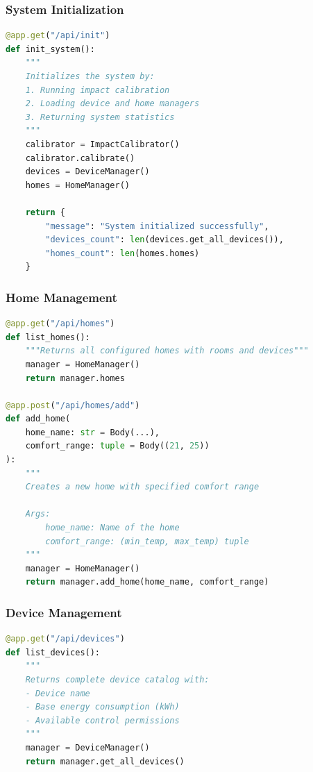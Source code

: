 \documentclass[12pt,a4paper]{article}
\begin{document}
\subsubsection{System Initialization}

\begin{lstlisting}[language=Python, caption=System initialization endpoint]
@app.get("/api/init")
def init_system():
    """
    Initializes the system by:
    1. Running impact calibration
    2. Loading device and home managers
    3. Returning system statistics
    """
    calibrator = ImpactCalibrator()
    calibrator.calibrate()
    devices = DeviceManager()
    homes = HomeManager()
    
    return {
        "message": "System initialized successfully",
        "devices_count": len(devices.get_all_devices()),
        "homes_count": len(homes.homes)
    }
\end{lstlisting}

\subsubsection{Home Management}

\begin{lstlisting}[language=Python, caption=Home management endpoints]
@app.get("/api/homes")
def list_homes():
    """Returns all configured homes with rooms and devices"""
    manager = HomeManager()
    return manager.homes

@app.post("/api/homes/add")
def add_home(
    home_name: str = Body(...), 
    comfort_range: tuple = Body((21, 25))
):
    """
    Creates a new home with specified comfort range
    
    Args:
        home_name: Name of the home
        comfort_range: (min_temp, max_temp) tuple
    """
    manager = HomeManager()
    return manager.add_home(home_name, comfort_range)
\end{lstlisting}

\subsubsection{Device Management}

\begin{lstlisting}[language=Python, caption=Device catalog endpoint]
@app.get("/api/devices")
def list_devices():
    """
    Returns complete device catalog with:
    - Device name
    - Base energy consumption (kWh)
    - Available control permissions
    """
    manager = DeviceManager()
    return manager.get_all_devices()
\end{lstlisting}
\end{document}
